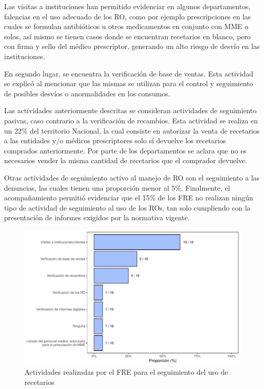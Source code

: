 \documentclass[
]{book}
\begin{document}
Las visitas a instituciones han permitido evidenciar en algunos departamentos, falencias en el uso adecuado de los RO, como por ejemplo prescripciones en las cuales se formulan antibióticos u otros medicamentos en conjunto con MME o solos, así mismo se tienen casos donde se encuentran recetarios en blanco, pero con firma y sello del médico prescriptor, generando un alto riesgo de desvío en las instituciones.

En segundo lugar, se encuentra la verificación de base de ventas. Esta actividad se explicó al mencionar que las mismas se utilizan para el control y seguimiento de posibles desvíos o anormalidades en los consumos.

Las actividades anteriormente descritas se consideran actividades de seguimiento pasivas, caso contrario a la verificación de recambios. Esta actividad se realiza en un 22\% del territorio Nacional, la cual consiste en autorizar la venta de recetarios a las entidades y/o médicos prescriptores solo sí devuelve los recetarios comprados anteriormente. Por parte de los departamentos se aclara que no es necesarios vender la misma cantidad de recetarios que el comprador devuelve.

Otras actividades de seguimiento activo al manejo de RO son el seguimiento a las denuncias, las cuales tienen una proporción menor al 5\%. Finalmente, el acompañamiento permitió evidenciar que el 15\% de los FRE no realizan ningún tipo de actividad de seguimiento al uso de los ROs, tan solo cumpliendo con la presentación de informes exigidos por la normativa vigente.

\begin{figure}

{\centering \includegraphics[width=0.85\linewidth]{InformeFinal_files/figure-latex/SeguimientoUsoRecetarios-1} 

}

\caption{Actividades realizadas por el FRE para el seguimiento del uso de recetarios}\label{fig:SeguimientoUsoRecetarios}
\end{figure}
\end{document}
